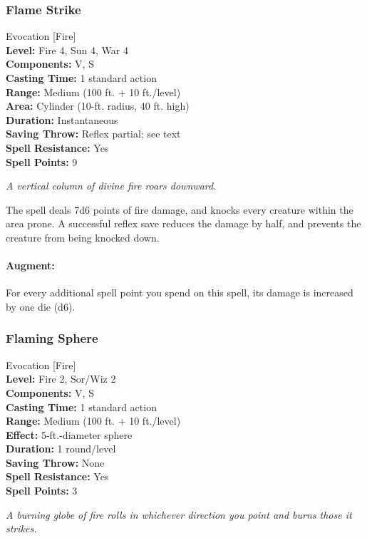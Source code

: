 \subsubsection{Flame Strike}
\label{Spell:FlameStrike}
Evocation [Fire]
\\ \textbf{Level:} Fire 4, Sun 4, War 4
\\ \textbf{Components:} V, S
\\ \textbf{Casting Time:} 1 standard action
\\ \textbf{Range:} Medium (100 ft. + 10 ft./level)
\\ \textbf{Area:} Cylinder (10-ft. radius, 40 ft. high)
\\ \textbf{Duration:} Instantaneous
\\ \textbf{Saving Throw:} Reflex partial; see text
\\ \textbf{Spell Resistance:} Yes
\\ \textbf{Spell Points:} 9

\emph{A vertical column of divine fire roars downward.}

The spell deals 7d6 points of fire damage, and knocks every creature within the area prone.
A successful reflex save reduces the damage by half, and prevents the creature from being knocked down.

\paragraph{Augment:} For every additional spell point you spend on this spell, its damage is increased by one die (d6).
\subsubsection{Flaming Sphere}
\label{Spell:FlamingSphere}
Evocation [Fire]
\\ \textbf{Level:} Fire 2, Sor/Wiz 2
\\ \textbf{Components:} V, S
\\ \textbf{Casting Time:} 1 standard action
\\ \textbf{Range:} Medium (100 ft. + 10 ft./level)
\\ \textbf{Effect:} 5-ft.-diameter sphere
\\ \textbf{Duration:} 1 round/level
\\ \textbf{Saving Throw:} None
\\ \textbf{Spell Resistance:} Yes
\\ \textbf{Spell Points:} 3

\emph{A burning globe of fire rolls in whichever direction you point and burns those it strikes.} 


